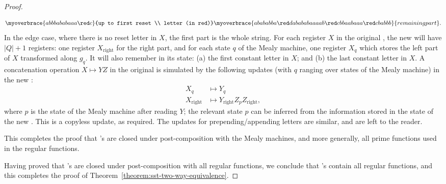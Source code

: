 \begin{proof}
\begin{itemize}
\begin{itemize}
\begin{align*}
\myoverbrace{abbbababaaa\red c}{up to first reset \\ letter (in red)}
\myoverbrace{abababba\red d abababaaaab \red c bbaabaaa \red c babbb}{remaining part}.
\end{align*}
In the edge case, where there is no reset letter in $X$, the first part is the whole string. For each register $X$ in the original \sst, the  new \sst will   have $|Q|+1$ registers: one register $X_{\text{right}}$ for the right part, and for each state $q$ of the Mealy machine, one register $X_q$  which stores the left part of $X$ transformed along $g_q$. It will also remember in its state: (a) the first constant letter in $X$; and (b) the last constant letter in $X$. A concatenation operation $X\mapsto  YZ$ in the original \sst is simulated by the following updates (with $q$ ranging over states of the Mealy machine) in the new \sst:
\begin{align*}
X_q & \mapsto  Y_q  \\
X_{\text{right}} & \mapsto  Y_{\text{right}} Z_p Z_{\text{right}},
\end{align*}
where $p$ is the state of the Mealy machine after reading $Y$; the relevant state $p$ can be inferred from the information stored in the state of the new \sst. This is a copyless update, as required. The updates for prepending/appending letters are similar, and are left to the reader.
\end{itemize}
This completes the proof that \sst's are closed under post-composition with the Mealy machines, and more generally, all prime functions used in the regular functions. 
\end{itemize}
Having proved that \sst's are closed under post-composition with all regular functions, we conclude that \sst's contain all regular functions, and this completes the proof of Theorem~\ref{theorem:sst-two-way-equivalence}.
\end{proof}



\exerciseheader

